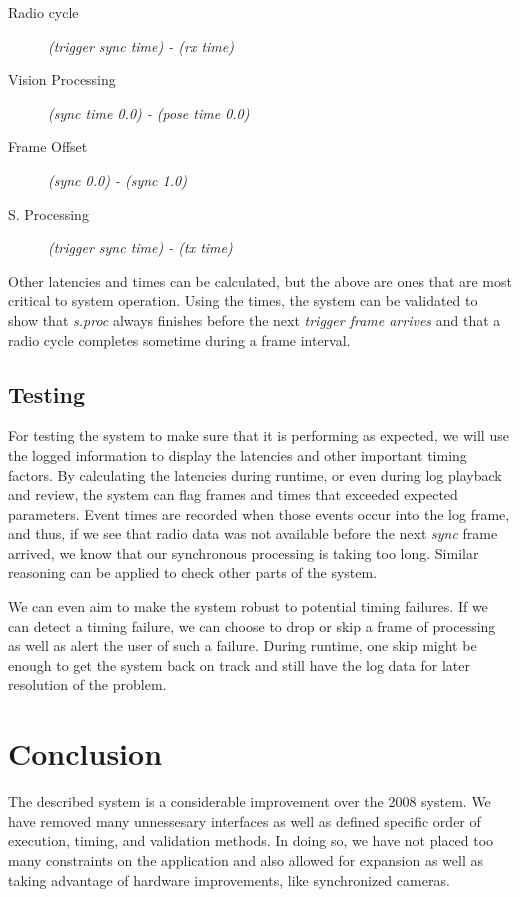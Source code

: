 \documentclass[letterpaper]{llncs}
\begin{document}
\begin{description}
\item [Radio cycle] \textit{(trigger sync time) - (rx time)}
\item [Vision Processing] \textit{(sync time 0.0) - (pose time 0.0)}
\item [Frame Offset] \textit{(sync 0.0) - (sync 1.0)}
\item [S. Processing] \textit{(trigger sync time) - (tx time)}
\end{description}

Other latencies and times can be calculated, but the above are ones that are most critical to system operation. Using the times, the system can be validated to show that \textit{s.proc} always finishes before the next \textit{trigger frame arrives} and that a radio cycle completes sometime during a frame interval.

\subsection{Testing}
For testing the system to make sure that it is performing as expected, we will use the logged information to display the latencies and other important timing factors. By calculating the latencies during runtime, or even during log playback and review, the system can flag frames and times that exceeded expected parameters. Event times are recorded when those events occur into the log frame, and thus, if we see that radio data was not available before the next \textit{sync} frame arrived, we know that our synchronous processing is taking too long. Similar reasoning can be applied to check other parts of the system. 

We can even aim to make the system robust to potential timing failures. If we can detect a timing failure, we can choose to drop or skip a frame of processing as well as alert the user of such a failure. During runtime, one skip might be enough to get the system back on track and still have the log data for later resolution of the problem.

\section{Conclusion}
The described system is a considerable improvement over the 2008 system. We have removed many unnessesary interfaces as well as defined specific order of execution, timing, and validation methods. In doing so, we have not placed too many constraints on the application and also allowed for expansion as well as taking advantage of hardware improvements, like synchronized cameras.
\end{document}
